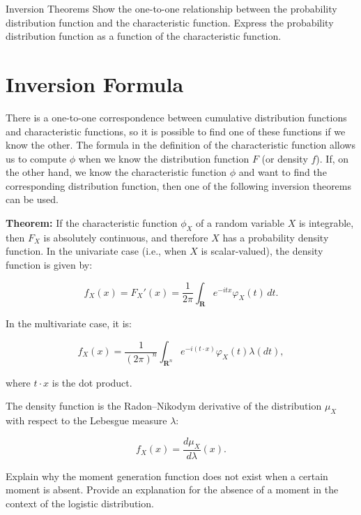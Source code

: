 \documentclass[UTF8,a4paper,10pt]{article}
\begin{document}
\begin{mybox}{}


\end{mybox}





\begin{Problem}[]{Inversion Theorems}
  Show the one-to-one relationship between the probability distribution function and the characteristic function. Express the probability distribution function as a function of the characteristic function.

\end{Problem}

\section*{Inversion Formula}

There is a one-to-one correspondence between cumulative distribution functions and characteristic functions, so it is possible to find one of these functions if we know the other. The formula in the definition of the characteristic function allows us to compute $\phi$ when we know the distribution function $F$ (or density $f$). If, on the other hand, we know the characteristic function $\phi$ and want to find the corresponding distribution function, then one of the following inversion theorems can be used.

\textbf{Theorem:} If the characteristic function $\phi_X$ of a random variable $X$ is integrable, then $F_X$ is absolutely continuous, and therefore $X$ has a probability density function. In the univariate case (i.e., when $X$ is scalar-valued), the density function is given by:

\[
f_{X}(x)=F_{X}'(x)=\frac{1}{2\pi}\int_{\mathbf{R}}e^{-itx}\varphi_{X}(t)\,dt.
\]

In the multivariate case, it is:

\[
f_{X}(x)=\frac{1}{(2\pi)^{n}}\int_{\mathbf{R}^{n}}e^{-i(t\cdot x)}\varphi_{X}(t)\lambda (dt),
\]

where $t\cdot x$ is the dot product.

The density function is the Radon–Nikodym derivative of the distribution $\mu_X$ with respect to the Lebesgue measure $\lambda$:

\[
f_{X}(x)=\frac{d\mu_{X}}{d\lambda}(x).
\]



\begin{Problem}[]{}
  Explain why the moment generation function does not exist when a certain moment is absent. Provide an explanation for the absence of a moment in the context of the logistic distribution.
\end{Problem}
\end{document}
